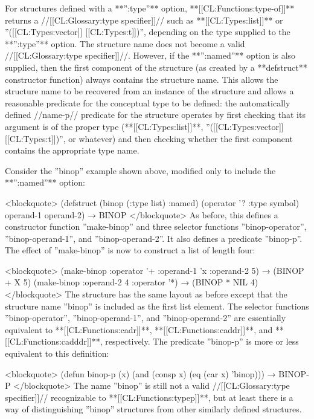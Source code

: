 For structures defined with a **'':type''** option, **[[CL:Functions:type-of]]** returns a //[[CL:Glossary:type specifier]]// such as **[[CL:Types:list]]** or ''([[CL:Types:vector]] [[CL:Types:t]])'', depending on the type supplied to the **'':type''** option. The structure name does not become a valid //[[CL:Glossary:type specifier]]//. However, if the **'':named''** option is also supplied, then the first component of the structure (as created by a **defstruct** constructor function) always contains the structure name. This allows the structure name to be recovered from an instance of the structure and allows a reasonable predicate for the conceptual type to be defined: the automatically defined //name-p// predicate for the structure operates by first checking that its argument is of the proper type (**[[CL:Types:list]]**, ''([[CL:Types:vector]] [[CL:Types:t]])'', or whatever) and then checking whether the first component contains the appropriate type name.

Consider the ''binop'' example shown above, modified only to include the **'':named''** option:

<blockquote> (defstruct (binop (:type list) :named) (operator '? :type symbol) operand-1 operand-2) → BINOP </blockquote> As before, this defines a constructor function ''make-binop'' and three selector functions ''binop-operator'', ''binop-operand-1'', and ''binop-operand-2''. It also defines a predicate ''binop-p''. The effect of ''make-binop'' is now to construct a list of length four:

<blockquote> (make-binop :operator '+ :operand-1 'x :operand-2 5) → (BINOP + X 5) (make-binop :operand-2 4 :operator '*) → (BINOP * NIL 4) </blockquote> The structure has the same layout as before except that the structure name ''binop'' is included as the first list element. The selector functions ''binop-operator'', ''binop-operand-1'', and ''binop-operand-2'' are essentially equivalent to **[[CL:Functions:cadr]]**, **[[CL:Functions:caddr]]**, and **[[CL:Functions:cadddr]]**, respectively. The predicate ''binop-p'' is more or less equivalent to this definition:

<blockquote> (defun binop-p (x) (and (consp x) (eq (car x) 'binop))) → BINOP-P </blockquote> The name ''binop'' is still not a valid //[[CL:Glossary:type specifier]]// recognizable to **[[CL:Functions:typep]]**, but at least there is a way of distinguishing ''binop'' structures from other similarly defined structures.


